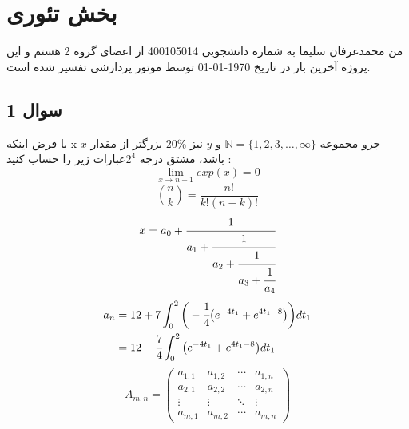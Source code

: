 \documentclass[twoside]{article}
\newcommand{\StudentID}{400105014}
\newcommand{\نام}{محمدعرفان سلیما}
\newcommand{\گروه}{2}
\newcommand{\CompileDate}{\today}
\begin{document}
\maketitlebox
\section*{بخش تئوری}
من \نام{} به شماره دانشجویی \StudentID{} از اعضای گروه \گروه{} هستم و این پروژه آخرین بار در تاریخ \CompileDate{}
توسط موتور پردازشی \XeLaTeX تفسیر شده است.

\subsection*{سوال 1}
 با فرض اینکه x جزو مجموعه  $\mathbb{N} = \{1,2,3,\dots,\infty\}$  و  $y$ نیز  $ \mathbb{\%}$20 بزرگتر از مقدار $x$ باشد، مشتق درجه $2^4$عبارات زیر را حساب کنید :
  \begin{equation}
{\lim_{x \to n-1} exp(x)=0}
 \end{equation}
 \begin{equation}
\binom{n}{k} = \frac{n!}{k!(n-k)!}
 \end{equation}
 \begin{equation}
    x=a_{0}+\cfrac{1}{a_{1}+\cfrac{1}
    {{a_{2}+\cfrac{1}{a_{3}+\cfrac{1}{a_{4}}}}}}
 \end{equation}
 \begin{align}
     a_{n} & = 12+7\int_{0}^{2}\bigg{(}-\cfrac{1}{4}
     \big{(}\nonumber
     e^{-4t_{1}}+e^{4t_{1}-8}\big{)}\bigg{)}  dt_{1}\\ 
     & = 12-\cfrac{7}{4}\int_{0}^{2}\big{(}
     e^{-4t_{1}}+e^{4t_{1}-8}\big{)} dt_{1}
  \end{align}    
\begin{equation}
A_{m,n} = 
\begin{pmatrix}
a_{1,1} & a_{1,2} & \cdots & a_{1,n} \\
a_{2,1} & a_{2,2} & \cdots & a_{2,n} \\
\vdots  & \vdots  & \ddots & \vdots  \\
a_{m,1} & a_{m,2} & \cdots & a_{m,n} 
\end{pmatrix}
\end{equation}
\end{document}
